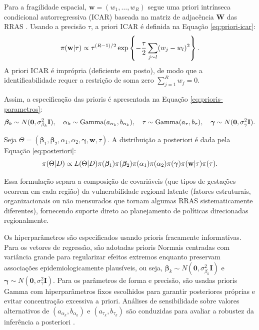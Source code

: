 Para a fragilidade espacial, $\mathbf{w}=(w_1,\ldots,w_R)$ segue uma priori intrínseca
condicional autorregressiva (ICAR) baseada na matriz de adjacência $\mathbf{W}$ das RRAS 
\cite{besag1991, rueheld2005}. Usando a precisão $\tau$, a priori ICAR é definida na Equação \ref{eq:priori-icar}:
\begin{equation}
\lequation{Priori espacial ICAR}
\label{eq:priori-icar}
\pi(\mathbf{w}| \tau)\propto
\tau^{(R-1)/2}
\exp\left\{
-\frac{\tau}{2}\sum_{j\sim l}(w_j-w_l)^2
\right\}.
\end{equation}
A priori ICAR é imprópria (deficiente em posto), de modo que a identificabilidade
requer a restrição de soma zero $\sum_{j=1}^{R}w_j=0$.

Assim, a especificação das prioris é apresentada na Equação \ref{eq:prioris-parametros}:
\begin{equation}
\lequation{Especificação das prioris dos parâmetros}
\label{eq:prioris-parametros}
\bm{\beta}_k\sim N(\mathbf{0},\sigma^2_{\beta_k}\mathbf{I}),\quad
\alpha_k\sim \operatorname{Gamma}(a_{\alpha_k},b_{\alpha_k}),\quad
\tau\sim \operatorname{Gamma}(a_\tau,b_\tau),\quad
\bm{\gamma}\sim N(\mathbf{0},\sigma^2_\gamma \mathbf{I}).
\end{equation}

Seja $\Theta=(\bm{\beta}_1,\bm{\beta}_2,\alpha_1,\alpha_2,\bm{\gamma},\mathbf{w},\tau)$. A distribuição
a posteriori é dada pela Equação \ref{eq:posteriori}:
\begin{equation}
\lequation{Distribuição a posteriori}
\label{eq:posteriori}
\pi(\Theta| D)\propto
L(\Theta| D)\pi(\bm{\beta}_1)\pi(\bm{\beta}_2)\pi(\alpha_1)\pi(\alpha_2)
\pi(\bm{\gamma})\pi(\mathbf{w}| \tau)\pi(\tau).
\end{equation}

Essa formulação separa a composição de covariáveis (que tipos de gestações
ocorrem em cada região) da vulnerabilidade regional latente (fatores estruturais,
organizacionais ou não mensurados que tornam algumas RRAS sistematicamente
diferentes), fornecendo suporte direto ao planejamento de políticas direcionadas
regionalmente.

Os hiperparâmetros são especificados usando prioris fracamente informativas. Para
os vetores de regressão, são adotadas prioris Normais centradas com variância grande
para regularizar efeitos extremos enquanto preservam associações
epidemiologicamente plausíveis, ou seja, 
$\bm{\beta}_k\sim N(\mathbf{0},\sigma^2_{\beta_k}\mathbf{I})$ e
$\bm{\gamma}\sim N(\mathbf{0},\sigma^2_\gamma \mathbf{I})$. Para os parâmetros de forma e precisão,
são usadas prioris Gamma com hiperparâmetros fixos escolhidos para garantir
posteriores próprias e evitar concentração excessiva a priori. Análises de 
sensibilidade sobre valores alternativos de $(a_{\alpha_k},b_{\alpha_k})$ e
$(a_{\tau_k},b_{\tau_k})$ são conduzidas para avaliar a robustez da inferência
a posteriori \cite{gelman2013, simpson2017, riebler2016}.
